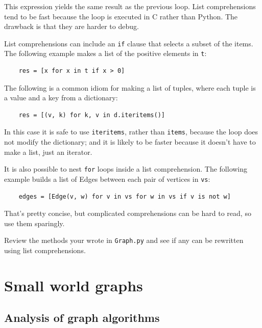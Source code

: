 \documentclass[10pt]{book}
\begin{document}
This expression yields the same result as the previous loop.  List
comprehensions tend to be fast because the loop is executed in C
rather than Python.  The drawback is that they are harder to debug.

List comprehensions can include an {\tt if} clause that selects a
subset of the items.  The following example makes a
list of the positive elements in {\tt t}:

\begin{verbatim}
    res = [x for x in t if x > 0]
\end{verbatim}

The following is a common idiom for making a list of tuples, where
each tuple is a value and a key from a dictionary:

\begin{verbatim}
    res = [(v, k) for k, v in d.iteritems()]
\end{verbatim}

In this case it is safe to use
{\tt iteritems}, rather than {\tt items}, because
the loop does not modify the dictionary; and it is likely to be
faster because it doesn't have to make a list, just an iterator.

It is also possible to nest {\tt for} loops inside
a list comprehension.  The following example builds a list
of Edges between each pair of vertices in {\tt vs}:

\begin{verbatim}
    edges = [Edge(v, w) for v in vs for w in vs if v is not w]
\end{verbatim}

That's pretty concise, but complicated comprehensions can be
hard to read, so use them sparingly.

\begin{exercise}

Review the methods your wrote in {\tt Graph.py} and see if any
can be rewritten using list comprehensions.

\end{exercise}


\chapter{Small world graphs}

\section{Analysis of graph algorithms}
\end{document}
